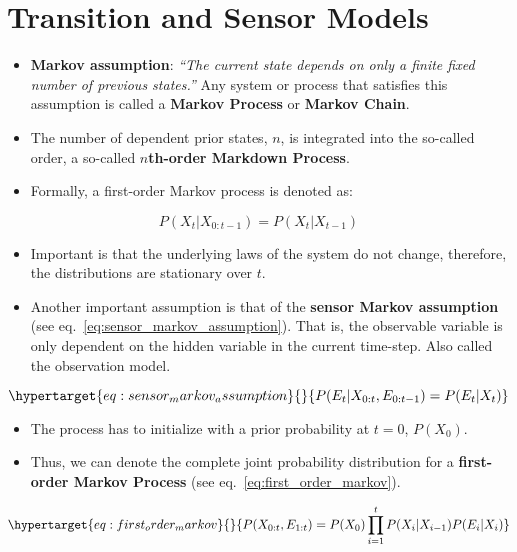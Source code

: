 \documentclass[
]{book}
\providecommand{\tightlist}{%
  \setlength{\itemsep}{0pt}\setlength{\parskip}{0pt}}
\begin{document}
\hypertarget{transition-and-sensor-models}{%
\section{Transition and Sensor
Models}\label{transition-and-sensor-models}}

\begin{itemize}
\tightlist
\item
  \textbf{Markov assumption}: \emph{``The current state depends on only
  a finite fixed number of previous states.''} Any system or process
  that satisfies this assumption is called a \textbf{Markov Process} or
  \textbf{Markov Chain}.
\item
  The number of dependent prior states, \(n\), is integrated into the
  so-called order, a so-called \textbf{\(n\)th-order Markdown Process}.
\item
  Formally, a first-order Markov process is denoted as:
\end{itemize}

\[
P(X_t|X_{0:t-1}) = P(X_t|X_{t-1})
\]

\begin{itemize}
\tightlist
\item
  Important is that the underlying laws of the system do not change,
  therefore, the distributions are stationary over \(t\).
\item
  Another important assumption is that of the \textbf{sensor Markov
  assumption} (see eq.~\ref{eq:sensor_markov_assumption}). That is, the
  observable variable is only dependent on the hidden variable in the
  current time-step. Also called the observation model.
\end{itemize}

\begin{equation}\protect\hypertarget{eq:sensor_markov_assumption}{}{
P(E_t|X_{0:t}, E_{0:t-1}) = P(E_t|X_t)
}\label{eq:sensor_markov_assumption}\end{equation}

\begin{itemize}
\tightlist
\item
  The process has to initialize with a prior probability at \(t=0\),
  \(P(X_0)\).
\item
  Thus, we can denote the complete joint probability distribution for a
  \textbf{first-order Markov Process} (see
  eq.~\ref{eq:first_order_markov}).
\end{itemize}

\begin{equation}\protect\hypertarget{eq:first_order_markov}{}{
P(X_{0:t}, E_{1:t}) = P(X_0) \prod^t_{i=1} P(X_i|X_{i-1})P(E_i|X_i)
}\label{eq:first_order_markov}\end{equation}
\end{document}
